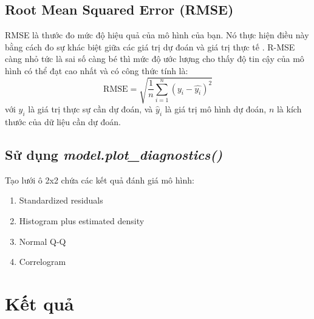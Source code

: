 \subsection{Root Mean Squared Error (RMSE)}
RMSE là thước đo mức độ hiệu quả của mô hình của bạn. Nó thực hiện điều này bằng cách đo sự khác biệt giữa các giá trị dự đoán và giá trị thực tế . R-MSE càng nhỏ tức là sai số càng bé thì mức độ ước lượng cho thấy độ tin cậy của mô hình có thể đạt cao nhất và có công thức tính là:
\begin{equation}
    \text{RMSE} = \sqrt{\frac{1}{n}\sum_{i=1}^n(y_i - \hat{y_i})^2}
\end{equation}
với $y_i$ là giá trị thực sự cần dự đoán, và $\hat{y}_i$ là giá trị mô hình dự đoán, $n$ là kích thước của dữ liệu cần dự đoán.

\subsection{Sử dụng \textit{model.plot\_diagnostics()}}
\noindent Tạo lưới ô 2x2 chứa các kết quả đánh giá mô hình:
\begin{enumerate}
    \item Standardized residuals 
    \item Histogram plus estimated density 
    \item Normal Q-Q
    \item Correlogram
\end{enumerate}

\section{Kết quả}

